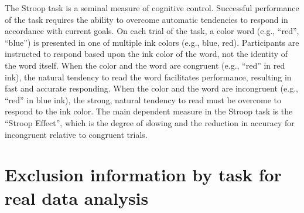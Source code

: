 \documentclass[sn-mathphys,Numbered, super]{sn-jnl}
\begin{document}
The Stroop task is a seminal measure of cognitive control. Successful performance of the task requires the ability to overcome automatic tendencies to respond in accordance with current goals. On each trial of the task, a color word (e.g., ``red'', ``blue'') is presented in one of multiple ink colors (e.g., blue, red). Participants are instructed to respond based upon the ink color of the word, not the identity of the word itself. When the color and the word are congruent (e.g., “red” in red ink), the natural tendency to read the word facilitates performance, resulting in fast and accurate responding. When the color and the word are incongruent (e.g., ``red'' in blue ink), the strong, natural tendency to read must be overcome to respond to the ink color. The main dependent measure in the Stroop task is the ``Stroop Effect'', which is the degree of slowing and the reduction in accuracy for incongruent relative to congruent trials.


\newpage
\section{Exclusion information by task for real data analysis}
\end{document}
